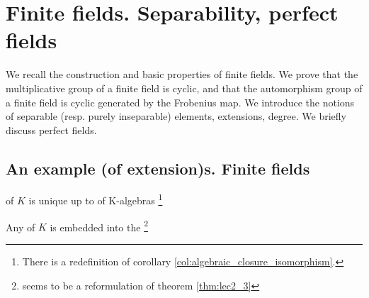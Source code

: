 \chapter{Finite fields. Separability, perfect fields}
We recall the construction and basic properties of finite fields. We
prove that the multiplicative group of a finite field is cyclic, and
that the automorphism group of a finite field is cyclic generated by
the Frobenius map. We introduce the notions of separable (resp. purely
inseparable) elements, extensions, degree. We briefly discuss perfect
fields.

\section{An example (of extension)s. Finite fields}

\begin{corollary}
   of $K$ is unique up to
   of K-algebras
  \footnote{
    There is a redefinition of corollary
    \ref{col:algebraic_closure_isomorphism}.
  }
  \label{col:lec3_1}
\end{corollary}

\begin{corollary}
  Any  of $K$ is embedded into the
   \footnote{seems to be a reformulation
    of theorem \ref{thm:lec2_3}}
  \label{col:lec3_2}
\end{corollary}

